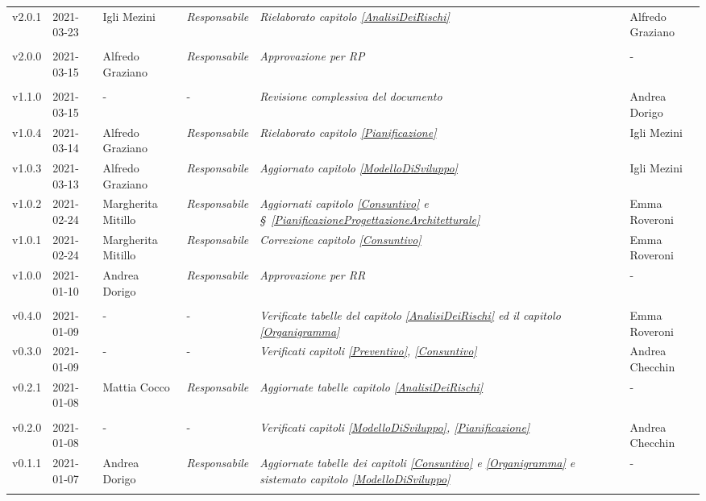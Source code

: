 {\begin{center}
\begin{longtable}[c]{|p{2cm-1\tabcolsep}|p{2cm}|p{3cm-2\tabcolsep}|p{}|p{}|p{4cm-2\tabcolsep}|}
		\hline
		\centering v2.0.1 & 2021-03-23 & Igli Mezini & \centering \textit{Responsabile} & \textit{Rielaborato capitolo \ref{AnalisiDeiRischi} } & \centering Alfredo Graziano \\ \tabularnewline
		\hline
		\centering v2.0.0 & 2021-03-15 & Alfredo Graziano & \centering \textit{Responsabile} & \textit{Approvazione per RP} & \centering - \\ \tabularnewline
		\hline
		\centering v1.1.0 & 2021-03-15 & \centering - & \centering - & \textit{Revisione complessiva del documento} & Andrea Dorigo  \\ 
		\hline
		\centering v1.0.4 & 2021-03-14 & Alfredo Graziano & \centering \textit{Responsabile} & \textit{Rielaborato capitolo  \ref{Pianificazione}} & Igli Mezini  \\ 
		\hline
		\centering v1.0.3 & 2021-03-13 & Alfredo Graziano & \centering \textit{Responsabile} & \textit{Aggiornato capitolo \ref{ModelloDiSviluppo}} & Igli Mezini  \\ 
		\hline
		\centering v1.0.2 & 2021-02-24 & Margherita Mitillo & \centering \textit{Responsabile} & \textit{Aggiornati capitolo \ref{Consuntivo} e  \S~\ref{PianificazioneProgettazioneArchitetturale}} & Emma Roveroni  \\ 
		\hline
		\centering v1.0.1 & 2021-02-24 & Margherita Mitillo & \centering \textit{Responsabile} & \textit{Correzione capitolo \ref{Consuntivo}} & Emma Roveroni  \\ 
		\hline
		\centering v1.0.0 & 2021-01-10 & Andrea Dorigo & \centering \textit{Responsabile} & \textit{Approvazione per RR} & \centering -  \\ \tabularnewline
		\hline
		\centering v0.4.0 & 2021-01-09 & \centering - & \centering - & \textit{Verificate tabelle del capitolo \ref{AnalisiDeiRischi} ed il capitolo \ref{Organigramma}} & Emma Roveroni  \\ 
		\hline
		\centering v0.3.0 & 2021-01-09 & \centering - & \centering - & \textit{Verificati capitoli \ref{Preventivo}, \ref{Consuntivo}} & Andrea Checchin \\
		\hline
		\centering v0.2.1 & 2021-01-08 & Mattia Cocco & \centering \textit{Responsabile} & \textit{Aggiornate tabelle capitolo  \ref{AnalisiDeiRischi}} & \centering -  \\ \tabularnewline
		\hline
		\centering v0.2.0 & 2021-01-08 & \centering - & \centering - & \textit{Verificati capitoli \ref{ModelloDiSviluppo}, \ref{Pianificazione}} & Andrea Checchin  \\ 
		\hline
		\centering v0.1.1 & 2021-01-07 & Andrea Dorigo & \centering \textit{Responsabile} & \textit{Aggiornate tabelle dei capitoli \ref{Consuntivo} e \ref{Organigramma} e sistemato capitolo \ref{ModelloDiSviluppo}} & \centering -  \\ \tabularnewline

\end{longtable}
\end{center}}
